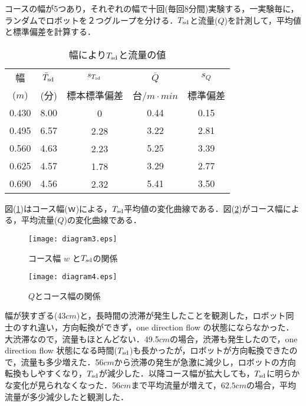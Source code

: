 コースの幅が5つあり，それぞれの幅で十回(毎回8分間)実験する，一実験毎に，ランダムでロボットを２つグループを分ける．$T_{\rm sd}$と流量($Q$)を計測して，平均値と標準偏差を計算する．\\
\begin{table}[!ht]
\setlength\tabcolsep{1pt}
\begin{center}
\begin{tabular}{|c|c|c|c|c|}
\hline
幅& $\bar{T}_{\rm sd}$ & $s_{T_{\rm sd}}$ & $\bar Q$ & $s_Q$ \\
($m$)   &  (分) & 標本標準偏差 & 台/$ m\cdot min$ & 標準偏差 \\
\hline
0.430 & 8.00 &　0 & 0.44 & 0.15 \\
\hline
0.495 & 6.57 &　2.28 & 3.22 & 2.81 \\
\hline
0.560 & 4.63 &　2.23 & 5.25 & 3.39 \\
\hline
0.625 & 4.57 &　1.78 & 3.29 & 2.77 \\
\hline
0.690 & 4.56 &　2.32 & 5.41 & 3.50 \\
\hline
\end{tabular}
\end{center}
\caption{
幅により$T_{\rm sd}$と流量の値
}
\end{table} 

図(\ref{dia1})はコース幅($ｗ$)による，$T_{\rm sd}$平均値の変化曲線である．図(\ref{dia2})がコース幅による，平均流量($Q$)の変化曲線である．
\vspace{-4mm}
\begin{figure}[!ht]
    \centering
    \texttt{[image: diagram3.eps]}
    \caption{コース幅 $w$ と$T_{\rm sd}$の関係}
    \label{dia1}
\end{figure}

\begin{figure}[!ht]
    \centering
    \texttt{[image: diagram4.eps]}
    \caption{$Q$とコース幅の関係}
    \label{dia2}
\end{figure}

幅が狭すぎる(43$cm$)と，長時間の渋滞が発生したことを観測した，ロボット同士のすれ違い，方向転換ができず，one direction flow の状態にならなかった．大渋滞なので，流量もほとんどない．49.5$cm$の場合，渋滞も発生したので，one direction flow 状態になる時間($T_{\rm sd}$)も長かったが，ロボットが方向転換できたので，流量も多少増えた．56$cm$から渋滞の発生が急激に減少し，ロボットの方向転換もしやすくなり，$T_{\rm sd}$が減少した．以降コース幅が拡大しても，$T_{\rm sd}$に明らかな変化が見られなくなった．56$cm$まで平均流量が増えて，$62.5cm$の場合，平均流量が多少減少したと観測した．

